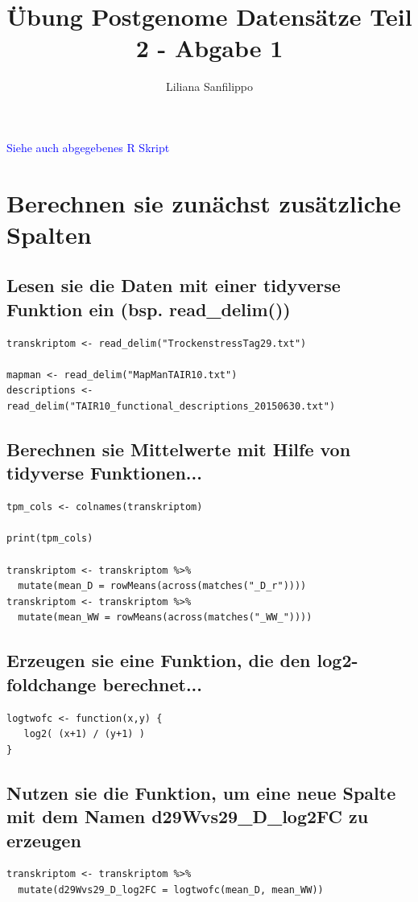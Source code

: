 \documentclass[11pt,a4paper]{article}
\title{Übung Postgenome Datensätze Teil 2 - Abgabe 1}
\author{Liliana Sanfilippo}
\date{}
\newcommand{\datei}[0]{\textcolor{blue}{Siehe auch abgegebenes R Skript}}
\begin{document}
    \maketitle
    \datei
    \section{Berechnen sie zunächst zusätzliche Spalten}
    \subsection{Lesen sie die Daten mit einer tidyverse Funktion ein (bsp. read\_delim())}
    \begin{verbatim}
transkriptom <- read_delim("TrockenstressTag29.txt")

mapman <- read_delim("MapManTAIR10.txt")
descriptions <- read_delim("TAIR10_functional_descriptions_20150630.txt")
    \end{verbatim}
    \subsection{Berechnen sie Mittelwerte mit Hilfe von tidyverse Funktionen...}
    \begin{verbatim}
tpm_cols <- colnames(transkriptom)

print(tpm_cols)

transkriptom <- transkriptom %>%
  mutate(mean_D = rowMeans(across(matches("_D_r"))))
transkriptom <- transkriptom %>%
  mutate(mean_WW = rowMeans(across(matches("_WW_"))))
    \end{verbatim}

    \subsection{Erzeugen sie eine Funktion, die den log2-foldchange berechnet...}
    \begin{verbatim}
logtwofc <- function(x,y) {
   log2( (x+1) / (y+1) )
}
    \end{verbatim}

    \subsection{Nutzen sie die Funktion, um eine neue Spalte mit dem Namen d29Wvs29\_D\_log2FC
    zu erzeugen}
    \begin{verbatim}
transkriptom <- transkriptom %>%
  mutate(d29Wvs29_D_log2FC = logtwofc(mean_D, mean_WW))
    \end{verbatim}
\end{document}

